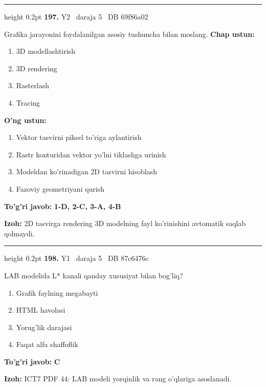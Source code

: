 \documentclass[10pt,a4paper,oneside]{article}
\begin{document}
\vspace{2mm}\hrule height 0.2pt \vspace{4mm}
\hypertarget{q197}{\textbf{\color{ink}197.}}  {\color{muted}\scriptsize Y2 \textbullet\ daraja 5 \textbullet\ DB 69f86a02}
\par
Grafika jarayonini foydalanilgan asosiy tushuncha bilan moslang.
\textbf{\footnotesize Chap ustun:}
\begin{enumerate}[label=\arabic*),leftmargin=9mm]
\item 3D modellashtirish
\item 3D rendering
\item Rasterlash
\item Tracing
\end{enumerate}
\textbf{\footnotesize O'ng ustun:}
\begin{enumerate}[label=\Alph*),leftmargin=9mm]
\item Vektor tasvirni piksel to'riga aylantirish
\item Rastr konturidan vektor yo'lni tiklashga urinish
\item Modeldan ko'rinadigan 2D tasvirni hisoblash
\item Fazoviy geometriyani qurish
\end{enumerate}
\begin{tcolorbox}[enhanced,breakable,colback=teal!4,colframe=teal!45!black,boxrule=0.45pt,arc=1.2mm,left=2.8mm,right=2.8mm,top=2mm,bottom=2mm,before skip=2mm,after skip=2mm]
\textbf{\color{teal}To'g'ri javob:} \textbf{1-D, 2-C, 3-A, 4-B}
\par\smallskip
\textbf{Izoh:} 2D tasvirga rendering 3D modelning fayl ko'rinishini avtomatik saqlab qolmaydi.
\end{tcolorbox}
\vspace{2mm}\hrule height 0.2pt \vspace{4mm}
\hypertarget{q198}{\textbf{\color{ink}198.}}  {\color{muted}\scriptsize Y1 \textbullet\ daraja 5 \textbullet\ DB 87c6476c}
\par
LAB modelida L* kanali qanday xususiyat bilan bog'liq?
\begin{enumerate}[label=\Alph*),leftmargin=9mm]
\item Grafik faylning megabayti
\item HTML havolasi
\item Yorug'lik darajasi
\item Faqat alfa shaffoflik
\end{enumerate}
\begin{tcolorbox}[enhanced,breakable,colback=teal!4,colframe=teal!45!black,boxrule=0.45pt,arc=1.2mm,left=2.8mm,right=2.8mm,top=2mm,bottom=2mm,before skip=2mm,after skip=2mm]
\textbf{\color{teal}To'g'ri javob:} \textbf{C}
\par\smallskip
\textbf{Izoh:} ICT7 PDF 44: LAB modeli yorqinlik va rang o'qlariga asoslanadi.
\end{tcolorbox}
\end{document}
